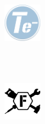 \includegraphics[width=0.12\textwidth]{./img/telectric_logo.png}
  \begin{minipage}[b][3\baselineskip][t]{21em}
    \centering
    \small
    \tipo\\
    \clase\\
    \subclase
  \end{minipage}
 \includegraphics[width=0.12\textwidth]{./img/factores_logo.png}



